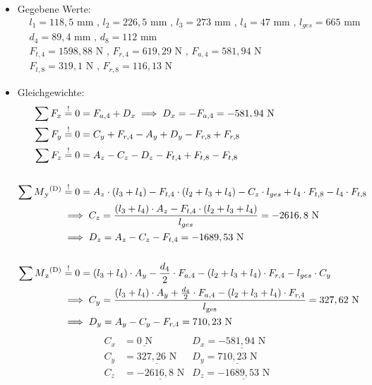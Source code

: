 \begin{itemize}
	\item Gegebene Werte: 
	\begin{align*}
	&l_{1} =118,5\text{ mm} \text{ , } l_{2} = 226,5\text{ mm} \text{ , } l_{3} = 273 \text{ mm} \text{ , } l_{4} = 47\text{ mm} \text{ , } l_{ges} = 665\text{ mm} \\
	&d_4 = 89,4\text{ mm} \text{ , } d_8 = 112 \text{ mm} \\
	&F_{t,4} = 1598,88 \text{ N} \text{ , } F_{r,4}  = 619,29\text{ N} \text{ , } F_{a,4} = 581,94 \text{ N} \\
	&F_{t,8} = 319,1 \text{ N} \text{ , } F_{r,8}  = 116,13\text{ N}
\end{align*}
	\item Gleichgewichte:
\begin{align*}
    \sum F_x &\overset{!}{=} 0 =F_{a,4} + D_x \implies D_x = -F_{a,4} =-581,94 \text{ N} \\
    \sum F_y &\overset{!}{=} 0 = C_y + F_{r,4}-A_y +D_y - F_{r,8} + F_{r,8}\\ 
    \sum F_z &\overset{!}{=} 0 = A_z - C_z - D_z - F_{t,4} + F_{t,8} - F_{t,8}\\ \\
    \sum M\textsubscript{y}\textsuperscript{(D)} &\overset{!}{=} 0 = A_z \cdot (l_3+l_4)- F_{t,4} \cdot (l_2+l_3+l_4) - C_z \cdot l_{ges} +l_4 \cdot F_{t,8}- l_4 \cdot F_{t,8} \\ 
    &\implies C_z = \frac{(l_3+l_4) \cdot A_z - F_{t,4} \cdot (l_2+l_3+l_4)}{l_{ges}} = -2616,8 \text { N} \\ 
    & \implies D_z = A_z - C_z - F_{t,4}= -1689,53 \text{ N}\\ \\
    \sum M\textsubscript{z}\textsuperscript{(D)} &\overset{!}{=} 0 = (l_3+l_4) \cdot A_y - \frac{d_4}{2} \cdot F_{a,4} - (l_2+l_3+l_4) \cdot F_{r,4}- l_{ges} \cdot C_y  \\ 
    &\implies C_y = \frac{(l_3+l_4) \cdot A_y + \frac{d_4}{2} \cdot F_{a,4} - (l_2+l_3+l_4) \cdot F_{r,4}}{l\textsubscript{ges}} = 327,62 \text{ N}\\ 
    & \implies D_y =   A_y - C_y - F_{r,4} =  710,23\text{ N}\\ 
\end{align*}
\begin{align*}
    C_x &= \underline{0\text{ N}} & D_x= \underline{-581,94\text{ N}}\\
    C_y &= \underline{327,26\text{ N}} & D_y= \underline{710,23\text{ N}}\\
    C_z &= \underline{-2616,8\text{ N}} & D_z= \underline{-1689,53\text{ N}}\\
\end{align*}
\end{itemize}
\newpage
